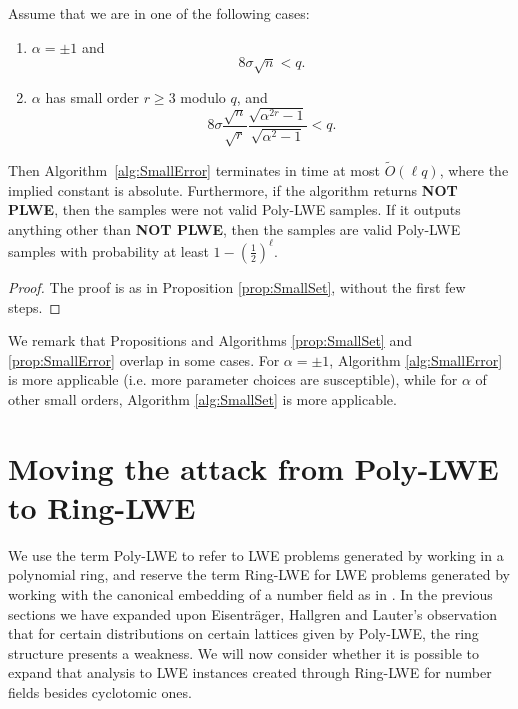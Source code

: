 \documentclass{llncs}
\newcommand{\<}{\langle}
\renewcommand{\>}{\rangle}
\begin{document}
\begin{proposition}
        \label{prop:SmallError}
        Assume that we are in one of the following cases:
        \begin{enumerate}
                \item $\alpha = \pm 1$ and \[ 8\sigma \sqrt{n} < q. \]
                \item  $\alpha$ has small order $r\geq 3$ modulo $ q$, and
                        \[
8 \sigma \dfrac{\sqrt{n}}{\sqrt{r}} \dfrac{\sqrt{\alpha^{2r}-1}}{\sqrt{\alpha^2-1}} < q.
\]
       \end{enumerate}

        Then Algorithm~\ref{alg:SmallError} terminates in time at most $\widetilde{O}(\ell q)$, where the implied constant is absolute.
        Furthermore, if the algorithm returns {\bf NOT PLWE}, then the samples were not valid Poly-LWE samples.
        If it outputs anything other than {\bf NOT PLWE}, then the samples are valid Poly-LWE samples with probability at least $1-(\frac{1}{2})^\ell$.
\end{proposition}

\begin{proof}
        The proof is as in Proposition \ref{prop:SmallSet}, without the first few steps.
\end{proof}


We remark that Propositions and Algorithms \ref{prop:SmallSet} and \ref{prop:SmallError} overlap in some cases.  For $\alpha=\pm 1$, Algorithm \ref{alg:SmallError} is more applicable (i.e. more parameter choices are susceptible), while for $\alpha$ of other small orders, Algorithm \ref{alg:SmallSet} is more applicable.

\section{Moving the attack from Poly-LWE to Ring-LWE}
\label{sec:moving}

We use the term Poly-LWE to refer to LWE problems generated by working in a polynomial ring, and reserve the term Ring-LWE for LWE problems generated by working with the canonical embedding of a number field as in \cite{LPR10,LPR2}.
In the previous sections we have expanded upon Eisentr\"ager, Hallgren and Lauter's observation that for certain distributions on certain lattices given by Poly-LWE, the ring structure presents a weakness.  We will now consider whether it is possible to expand that analysis to LWE instances created through Ring-LWE for number fields besides cyclotomic ones.
\end{document}
